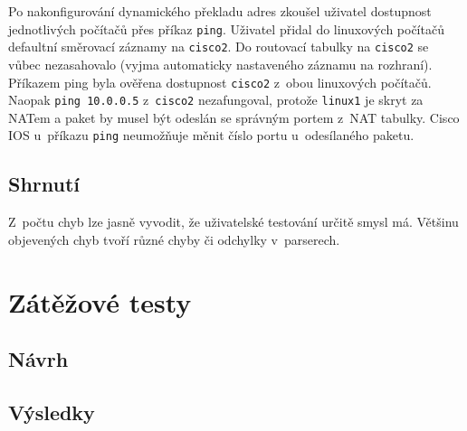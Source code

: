Po nakonfigurování dynamického překladu adres zkoušel uživatel dostupnost jednotlivých počítačů přes příkaz \verb|ping|. Uživatel přidal do linuxových počítačů defaultní směrovací záznamy na \verb|cisco2|. Do routovací tabulky na \verb|cisco2| se vůbec nezasahovalo (vyjma automaticky nastaveného záznamu na rozhraní). Příkazem ping byla ověřena dostupnost \verb|cisco2| z~obou linuxových počítačů. Naopak \verb|ping 10.0.0.5| z~\verb|cisco2| nezafungoval, protože \verb|linux1| je skryt za NATem a paket by musel být odeslán se správným portem z~NAT tabulky. Cisco IOS u~příkazu \verb|ping| neumožňuje měnit číslo portu u~odesílaného paketu.



\subsection{Shrnutí}
Z~počtu chyb lze jasně vyvodit, že uživatelské testování určitě smysl má. Většinu objevených chyb tvoří různé chyby či odchylky v~parserech.





\section{Zátěžové testy}\label{zatezove_testy}

\subsection{Návrh}

\subsection{Výsledky}

